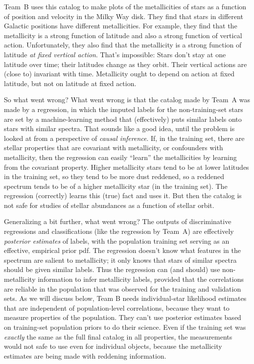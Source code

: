 \documentclass[10pt]{article}
\begin{document}
Team~B uses this catalog to make plots of the metallicities of stars as a function of position and velocity in the Milky Way disk.
They find that stars in different Galactic positions have different metallicities.
For example, they find that the metallicity is a strong function of latitude and also a strong function of vertical action.
Unfortunately, they also find that the metallicity is a strong function of latitude \emph{at fixed vertical action}.
That's impossible: Stars don't stay at one latitude over time; their latitudes change as they orbit.
Their vertical actions are (close to) invariant with time.
Metallicity ought to depend on action at fixed latitude, but not on latitude at fixed action.

So what went wrong?
What went wrong is that the catalog made by Team~A was made by a regression, in which the imputed labels for the non-training-set stars are set by a machine-learning method that (effectively) puts similar labels onto stars with similar spectra.
That sounds like a good idea, until the problem is looked at from a perspective of \emph{causal inference}.
If, in the training set, there are stellar properties that are covariant with metallicity, or confounders with metallicity, then the regression can easily ``learn'' the metallicities by learning from the covariant property.
Higher metallicity stars tend to be at lower latitudes in the training set, so they tend to be more dust reddened, so a reddened spectrum tends to be of a higher metallicity star (in the training set).
The regression (correctly) learns this (true) fact and uses it.
But then the catalog is not safe for studies of stellar abundances as a function of stellar orbit.

Generalizing a bit further, what went wrong?
The outputs of discriminative regressions and classifications (like the regression by Team~A) are effectively \emph{posterior estimates} of labels, with the population training set serving as an effective, empirical prior pdf.
The regression doesn't know what features in the spectrum are salient to metallicity; it only knows that stars of similar spectra should be given similar labels.
Thus the regression can (and should) use non-metallicity information to infer metallicity labels, provided that the correlations are reliable in the population that was observed for the training and validation sets.
As we will discuss below, Team B needs individual-star likelihood estimates that are independent of population-level correlations, because they want to measure properties of the population.
They can't use posterior estimates based on training-set population priors to do their science.
Even if the training set was \emph{exactly} the same as the full final catalog in all properties, the measurements would not safe to use even for individual objects, because the metallicity estimates are being made with reddening information.
\end{document}
